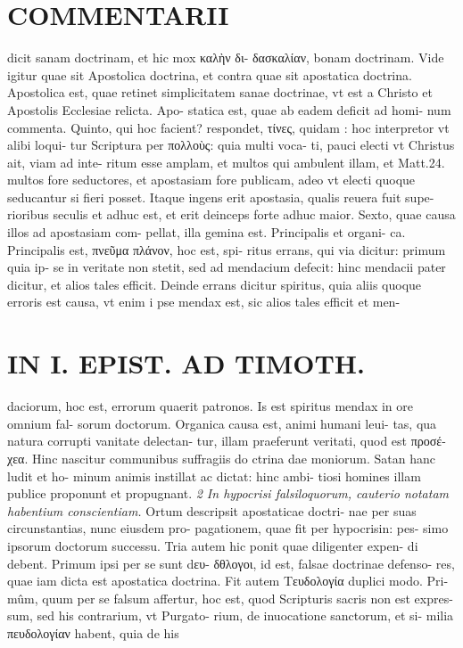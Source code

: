 \documentclass{article}
\begin{document}
\begin{pages}
\section*{COMMENTARII }
\marginpar{[ p.86 ]}\pstart dicit sanam doctrinam, et hic mox καλὴν δι- δασκαλίαν, bonam doctrinam. Vide igitur quae sit Apostolica doctrina, et contra quae sit apostatica doctrina. Apostolica est, quae retinet simplicitatem sanae doctrinae, vt est a Christo et Apostolis Ecclesiae relicta. Apo- statica est, quae ab eadem deficit ad homi- num commenta.  \pend\pstart Quinto, qui hoc facient? respondet, τίνες, quidam : hoc interpretor vt alibi loqui- tur Scriptura per πολλοὺς: quia multi voca- ti, pauci electi vt Christus ait, viam ad inte- ritum esse amplam, et multos qui ambulent illam, et Matt.24. multos fore seductores, et apostasiam fore publicam, adeo vt electi quoque seducantur si fieri posset. Itaque ingens erit apostasia, qualis reuera fuit supe- rioribus seculis et adhuc est, et erit deinceps forte adhuc maior.  \pend\pstart Sexto, quae causa illos ad apostasiam com- pellat, illa gemina est. Principalis et organi- ca. Principalis est, πνεῦμα πλάνον, hoc est, spi- ritus errans, qui via dicitur: primum quia ip- se in veritate non stetit, sed ad mendacium defecit: hinc mendacii pater dicitur, et alios tales efficit. Deinde errans dicitur spiritus, quia aliis quoque erroris est causa, vt enim i pse mendax est, sic alios tales efficit et men-  \pend
\section*{IN I. EPIST. AD TIMOTH. }
\marginpar{[ p.87 ]}\pstart daciorum, hoc est, errorum quaerit patronos. Is est spiritus mendax in ore omnium fal- sorum doctorum.  \pend\pstart Organica causa est, animi humani leui- tas, qua natura corrupti vanitate delectan- tur, illam praeferunt veritati, quod est προσέ- χεα. Hinc nascitur communibus suffragiis do ctrina dae moniorum. Satan hanc ludit et ho- minum animis instillat ac dictat: hinc ambi- tiosi homines illam publice proponunt et propugnant.  \pend
\textit{2 In hypocrisi falsiloquorum, cauterio notatam habentium conscientiam. }\pstart Ortum descripsit apostaticae doctri- nae per suas circunstantias, nunc eiusdem pro- pagationem, quae fit per hypocrisin: pes- simo ipsorum doctorum successu. Tria autem hic ponit quae diligenter expen- di debent. Primum ipsi per se sunt dευ- δθλογοι, id est, falsae doctrinae defenso- res, quae iam dicta est apostatica doctrina. Fit autem Τευδολογία duplici modo. Pri- mûm, quum per se falsum affertur, hoc est, quod Scripturis sacris non est expres- sum, sed his contrarium, vt Purgato- rium, de inuocatione sanctorum, et si- milia πευδολογίαν habent, quia de his  \pend

\end{pages}
\end{document}
